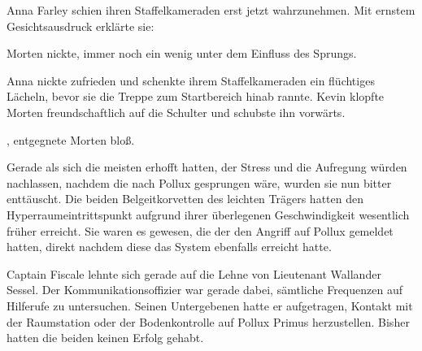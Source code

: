 Anna Farley schien ihren Staffelkameraden erst jetzt wahrzunehmen. Mit ernstem Gesichtsausdruck erklärte sie: 

\par

Morten nickte, immer noch ein wenig unter dem Einfluss des Sprungs. 

\par

Anna nickte zufrieden und schenkte ihrem Staffelkameraden ein flüchtiges Lächeln, bevor sie die Treppe zum Startbereich hinab rannte. Kevin klopfte Morten freundschaftlich auf die Schulter und schubste ihn vorwärts. 

\par

, entgegnete Morten bloß.

\par



\par

Gerade als sich die meisten erhofft hatten, der Stress und die Aufregung würden nachlassen, nachdem die  nach Pollux gesprungen wäre, wurden sie nun bitter enttäuscht. Die beiden Belgeitkorvetten des leichten Trägers hatten den Hyperraumeintrittspunkt aufgrund ihrer überlegenen Geschwindigkeit wesentlich früher erreicht. Sie waren es gewesen, die der  den Angriff auf Pollux gemeldet hatten, direkt nachdem diese das System ebenfalls erreicht hatte.

\par

Captain Fiscale lehnte sich gerade auf die Lehne von Lieutenant Wallander Sessel. Der Kommunikationsoffizier war gerade dabei, sämtliche Frequenzen auf Hilferufe zu untersuchen. Seinen Untergebenen hatte er aufgetragen, Kontakt mit der Raumstation  oder der Bodenkontrolle auf Pollux Primus herzustellen. Bisher hatten die beiden keinen Erfolg gehabt.

